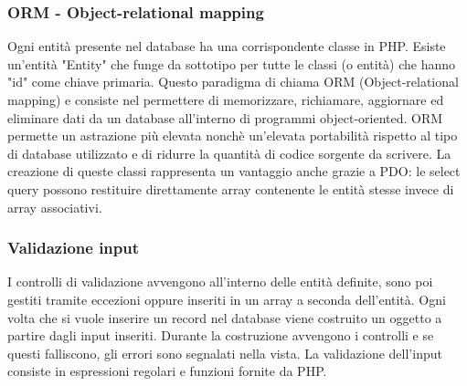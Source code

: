 \subsubsection{ORM - Object-relational mapping}
Ogni entità presente nel database ha una corrispondente classe in PHP. Esiste un'entità "Entity" che funge da sottotipo per tutte le classi (o entità) che hanno "id" come chiave primaria. Questo paradigma di chiama ORM (Object-relational mapping) e consiste nel permettere di memorizzare, richiamare, aggiornare ed eliminare dati da un database all’interno di programmi object-oriented. ORM permette un astrazione più elevata nonchè un'elevata portabilità rispetto al tipo di database utilizzato e di ridurre la quantità di codice sorgente da scrivere. La creazione di queste classi rappresenta un vantaggio anche grazie a PDO: le select query possono restituire direttamente array contenente le entità stesse invece di array associativi.
\subsubsection{Validazione input}
I controlli di validazione avvengono all'interno delle entità definite, sono poi gestiti tramite eccezioni oppure inseriti in un array a seconda dell'entità. Ogni volta che si vuole inserire un record nel database viene costruito un oggetto a partire dagli input inseriti. Durante la costruzione avvengono i controlli e se questi falliscono, gli errori sono segnalati nella vista. La validazione dell'input consiste in espressioni regolari e funzioni fornite da PHP.


